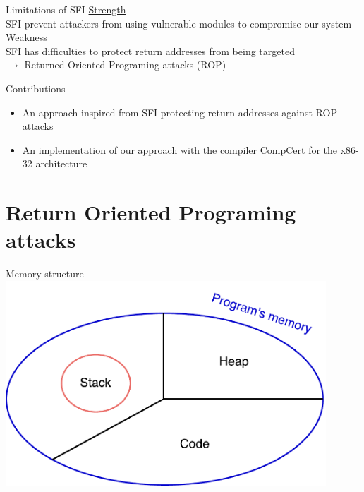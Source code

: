 \documentclass{beamer}
\begin{document}
\begin{frame}[c]{Limitations of SFI}
	\underline{Strength}\\
	SFI prevent attackers from using vulnerable modules to compromise our system\\
	\hfill \break
	\hfill \break
	\underline{Weakness}\\
	SFI has difficulties to protect return addresses from being targeted \\
	$\rightarrow$ Returned Oriented Programing attacks (ROP) 
\end{frame}

\begin{frame}[c]{Contributions}
\begin{itemize}\itemsep20pt
		\item An approach inspired from SFI protecting return addresses against ROP attacks
		\item An implementation of our approach with the compiler CompCert for the x86-32 architecture
	\end{itemize}
\end{frame}

\section{Return Oriented Programing attacks}
\label{sec:Return Oriented Programing attacks}

\begin{frame}[c]{Memory structure}
	\includegraphics[width=0.9\textwidth]{images/memory_struct.pdf}
\end{frame}
\end{document}
